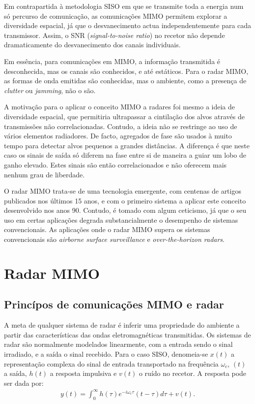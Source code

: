 \documentclass[purist,portuguese]{ist-report}
\begin{document}
Em contrapartida à metodologia SISO em que se transmite toda a energia num só percurso de comunicação, as comunicações MIMO permitem explorar a diversidade espacial, já que o desvanecimento actua independentemente para cada transmissor.
Assim, o SNR (\textit{signal-to-noise ratio}) no recetor não depende dramaticamente do desvanecimento dos canais individuais.

Em essência, para comunicações em MIMO, a informação transmitida é desconhecida, mas os canais são conhecidos, e até estáticos. Para o radar MIMO, as formas de onda emitidas são conhecidas, mas o ambiente, como a presença de \textit{clutter} ou \textit{jamming}, não o são.

A motivação para o aplicar o conceito MIMO a radares foi mesmo a ideia de diversidade espacial, que permitiria ultrapassar a cintilação dos alvos através de transmissões não correlacionadas.
Contudo, a ideia não se restringe ao uso de vários elementos radiadores.
De facto, agregados de fase  são usados à muito tempo para detectar alvos pequenos a grandes distâncias.
A diferença é que neste caso os sinais de saída só diferem na fase entre si de maneira a guiar um lobo de ganho elevado. 
Estes sinais são então correlacionados e não oferecem mais nenhum grau de liberdade.


O radar MIMO trata-se de uma tecnologia emergente, com centenas de artigos publicados nos últimos 15 anos, e com o primeiro sistema a aplicar este conceito desenvolvido nos anos 90.
Contudo, é tomado com algum ceticismo, já que o seu uso em certas aplicações degrada substancialmente o desempenho de sistemas convencionais.
As aplicações onde o radar MIMO supera os sistemas convencionais são \textit{airborne surface surveillance} e \textit{over-the-horizon radars}.

\section{Radar MIMO}

\subsection{Princípos de comunicações MIMO e radar}

A meta de qualquer sistema de radar é inferir uma propriedade do ambiente a partir das características das ondas eletromagnéticas transmitidas.
Os sistemas de radar são normalmente modelados linearmente, com a entrada sendo o sinal irradiado, e a saída o sinal recebido. 
Para o caso SISO, denomeia-se $x(t)$ a representação complexa do sinal de entrada transportado na frequência $\omega_c$, $(t)$ a saída, $h(t)$ a resposta impulsiva e $v(t)$ o ruído no recetor.
A resposta pode ser dada por:
\begin{align}
  y(t) = \int_0^\infty h(\tau)e^{-i\omega_c\tau}(t-\tau)d\tau + v(t).
  \label{eq:linearsiso}
\end{align}
\end{document}
